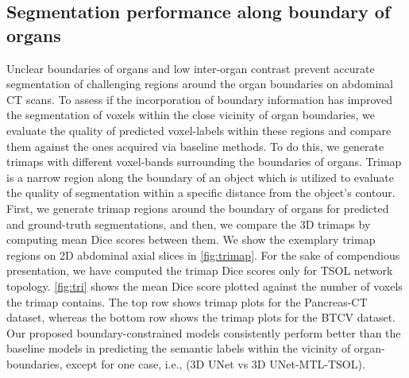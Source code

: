 \documentclass[final,5p,times,twocolumn]{elsarticle}
\begin{document}
\subsection{Segmentation performance along boundary of organs}
Unclear boundaries of organs and low inter-organ contrast prevent accurate segmentation of challenging regions around the organ boundaries on abdominal CT scans. To assess if the incorporation of boundary information has improved the segmentation of voxels within the close vicinity of organ boundaries, we evaluate the quality of predicted voxel-labels within these regions and compare them against the ones acquired via baseline methods. To do this, we generate trimaps \cite{4587417} \cite{Cheng2021BoundaryII} with different voxel-bands surrounding the boundaries of organs. Trimap is a narrow region along the boundary of an object which is utilized to evaluate the quality of segmentation within a specific distance from the object's contour. First, we generate trimap regions around the boundary of organs for predicted and ground-truth segmentations, and then, we compare the 3D trimaps by computing mean Dice scores between them. We show the exemplary trimap regions on 2D abdominal axial slices in \autoref{fig:trimap}. For the sake of compendious presentation, we have computed the trimap Dice scores only for TSOL network topology. \autoref{fig:tri} shows the mean Dice score plotted against the number of voxels the trimap contains. The top row shows trimap plots for the Pancreas-CT dataset, whereas the bottom row shows the trimap plots for the BTCV dataset. Our proposed boundary-constrained models consistently perform better than the baseline models in predicting the semantic labels within the vicinity of organ-boundaries, except for one case, i.e., (3D UNet vs 3D UNet-MTL-TSOL). 
\end{document}
